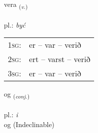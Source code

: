 \documentclass[frontgrid, backgrid]{flacards}\usepackage[]{graphicx}\usepackage[]{xcolor}
\begin{document}
\doublespacing











\renewcommand{\flhead}{\vskip5pt \fboxsep=0pt {\small\bfseries\footnotesize Sagnorð | czasownik}}
\renewcommand{\fcfoot}{\vskip5pt \fboxsep=0pt \hspace{2pt}{\small\bfseries\footnotesize 1K}}

\renewcommand{\blhead}{\vskip5pt {\small\bfseries\footnotesize Sagnorð | czasownik }}
\renewcommand{\bcfoot}{\vskip5pt \hspace{2pt}{\small\bfseries\footnotesize 1K}}


{vera \small{\textsubscript{(\textit{v.})}} \\[1ex] %
\textphonetic{[vɛːra]} \\
pl.: \emph{być} \\  [2ex]
\renewcommand*{\arraystretch}{0.8}
\begin{tabular}{p{1cm}l}
\textsc{1sg}: & er -- var -- verið \\ 
\textsc{2sg}: & ert -- varst -- verið \\ 
\textsc{3sg}: & er -- var -- verið \\ 
\end{tabular}
}


\renewcommand{\flhead}{\vskip5pt \fboxsep=0pt {\small\bfseries\footnotesize Samtenging | spójnik}}
\renewcommand{\fcfoot}{\vskip5pt \fboxsep=0pt \hspace{2pt}{\small\bfseries\footnotesize 1K}}

\renewcommand{\blhead}{\vskip5pt {\small\bfseries\footnotesize Samtenging | spójnik }}
\renewcommand{\bcfoot}{\vskip5pt \hspace{2pt}{\small\bfseries\footnotesize 1K}}


{og \small{\textsubscript{(\textit{conj.})}} \\[1ex]
\textphonetic{[ɔːɣ]} \\
pl.: \emph{i} \\  [2ex]
og (Indeclinable)}
\end{document}
